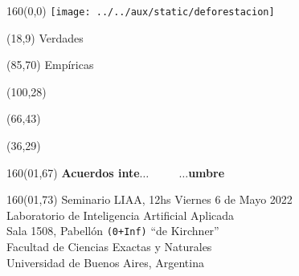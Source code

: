 \documentclass[shownotes,aspectratio=169]{beamer}
\begin{document}
\color{black!85}
\large

\begin{frame}


\begin{textblock}{160}(0,0)
\texttt{[image: ../../aux/static/deforestacion]}
\end{textblock}

\begin{textblock}{80}(18,9)
\textcolor{black!15}{\fontsize{44}{55}\selectfont Verdades}
\end{textblock}

\begin{textblock}{47}(85,70)
\centering \textcolor{black!15}{{\fontsize{52}{65}\selectfont Empíricas}}
\end{textblock}

\begin{textblock}{80}(100,28)
\LARGE  \textcolor{black!15}{}
\end{textblock}


\begin{textblock}{80}(66,43)
\LARGE  \textcolor{black!15}{\scalebox{6}{$=$}}
\end{textblock}

\begin{textblock}{80}(36,29)
\LARGE  \textcolor{black!15}{\scalebox{9}{$p$}}
\end{textblock}

\vspace{2cm}
\maketitle



\begin{textblock}{160}(01,67)
\normalsize \textcolor{black!5}{\textbf{Acuerdos inte$\dots \ \ \ \ \ \ \ \ \ \ \ \   \dots$umbre}}
\end{textblock}

\begin{textblock}{160}(01,73)
\scriptsize \textcolor{black!5}{Seminario LIAA, 12hs Viernes 6 de Mayo 2022 \\
Laboratorio de Inteligencia Artificial Aplicada \\
Sala 1508, Pabellón \texttt{(0+Inf)} ``de Kirchner'' \\
Facultad de Ciencias Exactas y Naturales \\
Universidad de Buenos Aires, Argentina}
\end{textblock}

\end{frame}
\end{document}
